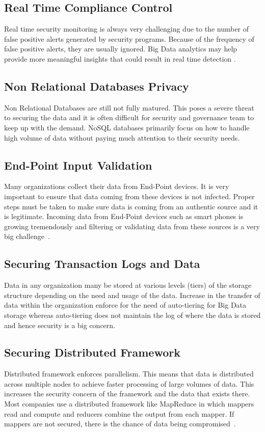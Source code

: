 \subsection{Real Time Compliance Control}
Real time security monitoring is always very challenging
due to the number of false positive alerts generated by
security programs.  Because of the frequency of false
positive alerts, they are usually ignored. Big Data analytics
may help provide more meaningful insights that could result 
in real time detection . 

\subsection{Non Relational Databases Privacy}
Non Relational Databases are still not fully matured. 
This poses a severe threat to securing the data and it is often
difficult for security and governance team to keep up with the 
demand. NoSQL databases primarily focus on how to handle high
volume of data without paying much attention to their
security needs. 

\subsection{End-Point Input Validation}
Many organizations collect their data from End-Point devices. 
It is very important to ensure that data coming from these
devices is not infected. Proper steps must be taken to make
sure data is coming from an authentic source and it is legitimate. 
Incoming data from End-Point devices such as smart phones is
growing tremendously and filtering or validating data from 
these sources is a very big challenge~\cite{csasecurity}. 

\subsection{Securing Transaction Logs and Data}
Data in any organization many be stored at various levels (tiers)
of the storage structure depending on the need and usage of
the data. Increase in the transfer of data within the organization
enforce for the need of auto-tiering for Big Data storage whereas
auto-tiering does not maintain the log of where the data is stored
and hence security is a big concern.

\subsection{Securing Distributed Framework}
Distributed framework enforces parallelism. This means that
data is distributed across multiple nodes to achieve faster
processing of large volumes of data. This increases the
security concern of the framework and the data that exists 
there. Most companies use a distributed framework like
MapReduce in which mappers read and compute and reducers
combine the output from each mapper. If mappers are not 
secured, there is the chance of data being 
compromised~\cite{dataconomy}.

